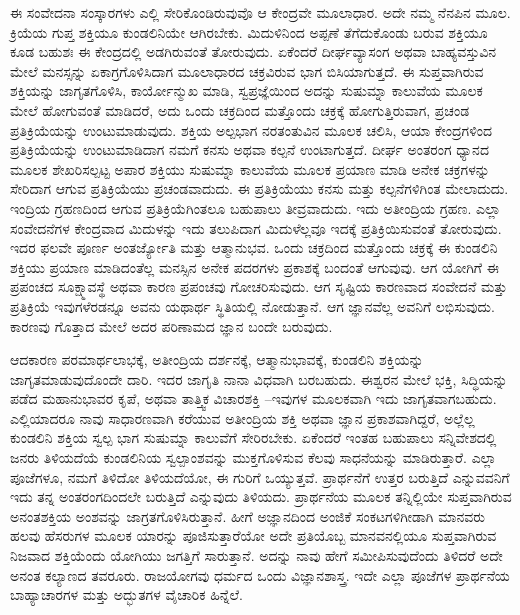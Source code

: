 ಈ ಸಂವೇದನಾ ಸಂಸ್ಕಾರಗಳು ಎಲ್ಲಿ ಸೇರಿಕೊಂಡಿರುವುವೊ ಆ ಕೇಂದ್ರವೇ ಮೂಲಾಧಾರ. ಅದೇ ನಮ್ಮ ನೆನಪಿನ ಮೂಲ. ಕ್ರಿಯೆಯ ಗುಪ್ತ ಶಕ್ತಿಯೂ ಕುಂಡಲಿನಿಯೇ ಆಗಿರಬೇಕು. ಮಿದುಳಿನಿಂದ ಅಪ್ಪಣೆ ತೆಗೆದುಕೊಂಡು ಬರುವ ಶಕ್ತಿಯೂ ಕೂಡ ಬಹುಶಃ ಈ ಕೇಂದ್ರದಲ್ಲಿ ಅಡಗಿರುವಂತೆ ತೋರುವುದು. ಏಕೆಂದರೆ ದೀರ್ಘವ್ಯಾಸಂಗ ಅಥವಾ ಬಾಹ್ಯವಸ್ತುವಿನ ಮೇಲೆ ಮನಸ್ಸನ್ನು ಏಕಾಗ್ರಗೊಳಿಸಿದಾಗ ಮೂಲಾಧಾರದ ಚಕ್ರವಿರುವ ಭಾಗ ಬಿಸಿಯಾಗುತ್ತದೆ. ಈ ಸುಪ್ತವಾಗಿರುವ ಶಕ್ತಿಯನ್ನು ಜಾಗೃತಗೊಳಿಸಿ, ಕಾರ್ಯೋನ್ಮುಖ ಮಾಡಿ, ಸ್ವಪ್ರಜ್ಞೆಯಿಂದ ಅದನ್ನು ಸುಷುಮ್ನಾ ಕಾಲುವೆಯ ಮೂಲಕ ಮೇಲೆ ಹೋಗುವಂತೆ ಮಾಡಿದರೆ, ಅದು ಒಂದು ಚಕ್ರದಿಂದ ಮತ್ತೊಂದು ಚಕ್ರಕ್ಕೆ ಹೋಗುತ್ತಿರುವಾಗ, ಪ್ರಚಂಡ ಪ್ರತಿಕ್ರಿಯೆಯನ್ನು ಉಂಟುಮಾಡುವುದು. ಶಕ್ತಿಯ ಅಲ್ಪಭಾಗ ನರತಂತುವಿನ ಮೂಲಕ ಚಲಿಸಿ, ಆಯಾ ಕೇಂದ್ರಗಳಿಂದ ಪ್ರತಿಕ್ರಿಯೆಯನ್ನು ಉಂಟುಮಾಡಿದಾಗ ನಮಗೆ ಕನಸು ಅಥವಾ ಕಲ್ಪನೆ ಉಂಟಾಗುತ್ತದೆ. ದೀರ್ಘ ಅಂತರಂಗ ಧ್ಯಾನದ ಮೂಲಕ ಶೇಖರಿಸಲ್ಪಟ್ಟ ಅಪಾರ ಶಕ್ತಿಯು ಸುಷುಮ್ನಾ ಕಾಲುವೆಯ ಮೂಲಕ ಪ್ರಯಾಣ ಮಾಡಿ ಅನೇಕ ಚಕ್ರಗಳನ್ನು ಸೇರಿದಾಗ ಆಗುವ ಪ್ರತಿಕ್ರಿಯೆಯು ಪ್ರಚಂಡವಾದುದು. ಈ ಪ್ರತಿಕ್ರಿಯೆಯು ಕನಸು ಮತ್ತು ಕಲ್ಪನೆಗಳಿಗಿಂತ ಮೇಲಾದುದು. ಇಂದ್ರಿಯ ಗ್ರಹಣದಿಂದ ಆಗುವ ಪ್ರತಿಕ್ರಿಯೆ\break ಗಿಂತಲೂ ಬಹುಪಾಲು ತೀವ್ರವಾದುದು. ಇದು ಅತೀಂದ್ರಿಯ ಗ್ರಹಣ. ಎಲ್ಲಾ ಸಂವೇದನೆ\break ಗಳ ಕೇಂದ್ರವಾದ ಮಿದುಳನ್ನು ಇದು ತಲುಪಿದಾಗ ಮಿದುಳೆಲ್ಲವೂ ಇದಕ್ಕೆ ಪ್ರತಿಕ್ರಿಯಿಸುವಂತೆ ತೋರುವುದು. ಇದರ ಫಲವೇ ಪೂರ್ಣ ಅಂತರ್ಜ್ಯೋತಿ ಮತ್ತು ಆತ್ಮಾನುಭವ. ಒಂದು ಚಕ್ರದಿಂದ ಮತ್ತೊಂದು ಚಕ್ರಕ್ಕೆ ಈ ಕುಂಡಲಿನಿ ಶಕ್ತಿಯು ಪ್ರಯಾಣ ಮಾಡಿದಂತೆಲ್ಲ ಮನಸ್ಸಿನ ಅನೇಕ ಪದರಗಳು ಪ್ರಕಾಶಕ್ಕೆ ಬಂದಂತೆ ಆಗುವುವು. ಆಗ ಯೋಗಿಗೆ ಈ ಪ್ರಪಂಚದ ಸೂಕ್ಷ್ಮಾವಸ್ಥೆ ಅಥವಾ ಕಾರಣ ಪ್ರಪಂಚವು ಗೋಚರಿಸುವುದು. ಆಗ ಸೃಷ್ಟಿಯ ಕಾರಣವಾದ ಸಂವೇದನೆ ಮತ್ತು ಪ್ರತಿಕ್ರಿಯೆ ಇವುಗಳೆರಡನ್ನೂ ಅವನು ಯಥಾರ್ಥ ಸ್ಥಿತಿಯಲ್ಲಿ ನೋಡುತ್ತಾನೆ. ಆಗ ಜ್ಞಾನವೆಲ್ಲ ಅವನಿಗೆ ಲಭಿಸುವುದು. ಕಾರಣವು ಗೊತ್ತಾದ ಮೇಲೆ ಅದರ ಪರಿಣಾಮದ ಜ್ಞಾನ ಬಂದೇ ಬರುವುದು. 


ಆದಕಾರಣ ಪರಮಾರ್ಥಲಾಭಕ್ಕೆ, ಅತೀಂದ್ರಿಯ ದರ್ಶನಕ್ಕೆ, ಆತ್ಮಾನುಭಾವಕ್ಕೆ, ಕುಂಡಲಿನಿ ಶಕ್ತಿಯನ್ನು ಜಾಗೃತಮಾಡುವುದೊಂದೇ ದಾರಿ. ಇದರ ಜಾಗೃತಿ ನಾನಾ ವಿಧವಾಗಿ ಬರಬಹುದು. ಈಶ್ವರನ ಮೇಲೆ ಭಕ್ತಿ, ಸಿದ್ಧಿಯನ್ನು ಪಡೆದ ಮಹಾನುಭಾವರ ಕೃಪೆ, ಅಥವಾ ತಾತ್ತ್ವಿಕ ವಿಚಾರಶಕ್ತಿ –ಇವುಗಳ ಮೂಲಕವಾಗಿ ಇದು ಜಾಗೃತವಾಗಬಹುದು. ಎಲ್ಲಿಯಾದರೂ ನಾವು ಸಾಧಾರಣವಾಗಿ ಕರೆಯುವ ಅತೀಂದ್ರಿಯ ಶಕ್ತಿ ಅಥವಾ ಜ್ಞಾನ ಪ್ರಕಾಶವಾಗಿದ್ದರೆ, ಅಲ್ಲೆಲ್ಲ ಕುಂಡಲಿನಿ ಶಕ್ತಿಯ ಸ್ವಲ್ಪ ಭಾಗ ಸುಷುಮ್ನಾ ಕಾಲುವೆಗೆ ಸೇರಿರಬೇಕು. ಏಕೆಂದರೆ ಇಂತಹ ಬಹುಪಾಲು ಸನ್ನಿವೇಶದಲ್ಲಿ ಜನರು ತಿಳಿಯದೆಯೆ ಕುಂಡಲಿನಿಯ ಸ್ವಲ್ಪಾಂಶವನ್ನು ಮುಕ್ತಗೊಳಿಸುವ ಕೆಲವು ಸಾಧನೆಯನ್ನು ಮಾಡಿರುತ್ತಾರೆ. ಎಲ್ಲಾ ಪೂಜೆಗಳೂ, ನಮಗೆ ತಿಳಿದೋ ತಿಳಿಯದೆಯೋ, ಈ ಗುರಿಗೆ ಒಯ್ಯುತ್ತವೆ. ಪ್ರಾರ್ಥನೆಗೆ ಉತ್ತರ ಬರುತ್ತಿದೆ ಎನ್ನುವವನಿಗೆ ಇದು ತನ್ನ ಅಂತರಂಗದಿಂದಲೇ ಬರುತ್ತಿದೆ ಎನ್ನುವುದು ತಿಳಿಯದು. ಪ್ರಾರ್ಥನೆಯ ಮೂಲಕ ತನ್ನಿಲ್ಲಿಯೇ ಸುಪ್ತವಾಗಿರುವ ಅನಂತಶಕ್ತಿಯ ಅಂಶವನ್ನು ಜಾಗ್ರತಗೊಳಿಸಿರುತ್ತಾನೆ. ಹೀಗೆ ಅಜ್ಞಾನದಿಂದ ಅಂಜಿಕೆ ಸಂಕಟಗಳಿಗೀಡಾಗಿ ಮಾನವರು ಹಲವು ಹೆಸರುಗಳ ಮೂಲಕ ಯಾರನ್ನು ಪೂಜಿಸುತ್ತಾರೆಯೋ ಅದೇ ಪ್ರತಿಯೊಬ್ಬ ಮಾನವನಲ್ಲಿಯೂ ಸುಪ್ತವಾಗಿರುವ ನಿಜವಾದ ಶಕ್ತಿಯೆಂದು ಯೋಗಿಯು ಜಗತ್ತಿಗೆ ಸಾರುತ್ತಾನೆ. ಅದನ್ನು ನಾವು ಹೇಗೆ ಸಮೀಪಿಸುವುದೆಂದು ತಿಳಿದರೆ ಅದೇ ಅನಂತ ಕಲ್ಯಾಣದ ತವರೂರು. ರಾಜಯೋಗವು ಧರ್ಮದ ಒಂದು ವಿಜ್ಞಾನಶಾಸ್ತ್ರ. ಇದೇ ಎಲ್ಲಾ ಪೂಜೆಗಳ ಪ್ರಾರ್ಥನೆಯ ಬಾಹ್ಯಾಚಾರಗಳ ಮತ್ತು ಅದ್ಭುತಗಳ ವೈಚಾರಿಕ ಹಿನ್ನೆಲೆ.

